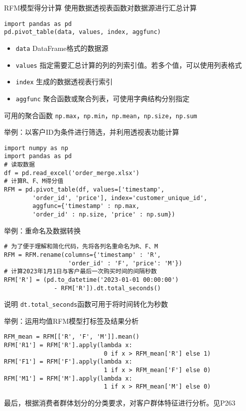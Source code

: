 \documentclass[t]{beamer}
\begin{document}
\begin{frame}[fragile]{RFM模型得分计算}
  使用数据透视表函数对数据源进行汇总计算
\begin{lstlisting}
import pandas as pd
pd.pivot_table(data, values, index, aggfunc)
\end{lstlisting}
\begin{itemize}
  \item \verb|data| DataFrame格式的数据源
  \item \verb|values| 指定需要汇总计算的列的列索引值。若多个值，可以使用列表格式
  \item \verb|index| 生成的数据透视表行索引
  \item \verb|aggfunc| 聚合函数或聚合列表，可使用字典结构分别指定
\end{itemize}

\begin{block}{可用的聚合函数}
\verb|np.max|，\verb|np.min|，\verb|np.mean|，\verb|np.size|，\verb|np.sum|
\end{block}
\end{frame}


\begin{frame}[fragile]{举例：以客户ID为条件进行筛选，并利用透视表功能计算}
\begin{lstlisting}
import numpy as np
import pandas as pd
# 读取数据
df = pd.read_excel('order_merge.xlsx')
# 计算R、F、M得分值
RFM = pd.pivot_table(df, values=['timestamp', 
        'order_id', 'price'], index='customer_unique_id',
        aggfunc={'timestamp' : np.max, 
        'order_id' : np.size, 'price' : np.sum})
\end{lstlisting}
\end{frame}


\begin{frame}[fragile]{举例：重命名及数据转换}
\begin{lstlisting}
# 为了便于理解和简化代码，先将各列名重命名为R、F、M 
RFM = RFM.rename(columns={'timestamp' : 'R', 
                  'order_id' : 'F', 'price': 'M'})
# 计算2023年1月1日与客户最后一次购买时间的间隔秒数
RFM['R'] = (pd.to_datetime('2023-01-01 00:00:00') 
              - RFM['R']).dt.total_seconds() 
\end{lstlisting}

\begin{block}{说明}
  \verb|dt.total_seconds|函数可用于将时间转化为秒数
\end{block}
\end{frame}


\begin{frame}[fragile]{举例：运用均值RFM模型打标签及结果分析}
\begin{lstlisting}
RFM_mean = RFM[['R', 'F', 'M']].mean()
RFM['R1'] = RFM['R'].apply(lambda x: 
                            0 if x > RFM_mean['R'] else 1) 
RFM['F1'] = RFM['F'].apply(lambda x: 
                            1 if x > RFM_mean['F'] else 0) 
RFM['M1'] = RFM['M'].apply(lambda x: 
                            1 if x > RFM_mean['M'] else 0)
\end{lstlisting}

最后，根据消费者群体划分的分类要求，对客户群体特征进行分析。见P263
\end{frame}
\end{document}

